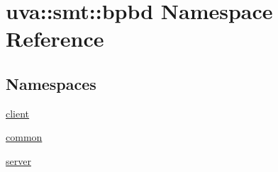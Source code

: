 \hypertarget{namespaceuva_1_1smt_1_1bpbd}{}\section{uva\+:\+:smt\+:\+:bpbd Namespace Reference}
\label{namespaceuva_1_1smt_1_1bpbd}
\subsection*{Namespaces}
\begin{DoxyCompactItemize}
\item 
 \hyperlink{namespaceuva_1_1smt_1_1bpbd_1_1client}{client}
\item 
 \hyperlink{namespaceuva_1_1smt_1_1bpbd_1_1common}{common}
\item 
 \hyperlink{namespaceuva_1_1smt_1_1bpbd_1_1server}{server}
\end{DoxyCompactItemize}
